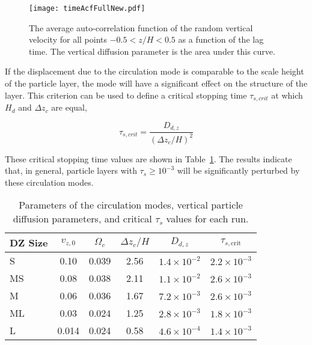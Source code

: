 \begin{figure}[p]
\centering
\texttt{[image: timeAcfFullNew.pdf]}
\caption{The average auto-correlation function of the random vertical velocity for all points $-0.5<z/H<0.5$ as a function of the lag time.  The vertical diffusion parameter is the area under this curve.  }
\label{plotCCF}
\end{figure}

If the displacement due to the circulation mode is comparable to the scale height of the particle layer, the mode will have a significant effect on the structure of the layer.  This criterion can be used to define a critical stopping time $\tau_{s,crit}$ at which $H_d$ and $\Delta z_c$ are equal,

\begin{equation}
\tau_{s,crit} = \frac{D_{d,z}}{(\Delta z_c/H)^2}   
\end{equation} 

\noindent These critical stopping time values are shown in Table~\ref{tabCorrugation}.  The results indicate that, in general, particle layers with $\tau_s \geq 10^{-3}$ will be significantly perturbed by these circulation modes.

\begin{table}
\centering
 \begin{tabular}{|l | c | c | c | c | c |} 
 \hline
 DZ Size & $v_{z,0}$ & $\Omega_c$ & $\Delta z_c/H$ & $D_{d,z}$ & $\tau_{s,\text{crit}}$ \\  
 \hline
 S & 0.10 & 0.039 & 2.56 & $1.4\times10^{-2}$ & $2.2\times10^{-3}$ \\
 \hline
  MS & 0.08 & 0.038 & 2.11 & $1.1\times10^{-2}$ & $2.6\times10^{-3}$ \\
 \hline
  M & 0.06 & 0.036 & 1.67 & $7.2\times10^{-3}$ & $2.6\times10^{-3}$ \\
 \hline
 ML & 0.03 & 0.024 & 1.25 & $2.8\times10^{-3}$ & $1.8\times10^{-3}$ \\
 \hline
 L & 0.014 & 0.024 & 0.58 & $4.6\times10^{-4}$ & $1.4\times10^{-3}$ \\
 \hline
\end{tabular}
\caption{Parameters of the circulation modes, vertical particle diffusion parameters, and critical $\tau_s$ values for each run.  }
\label{tabCorrugation}
\end{table}





